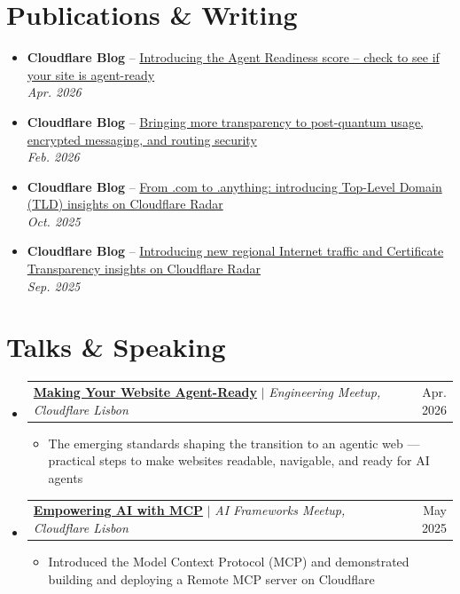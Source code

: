 \documentclass[letterpaper,11pt]{article}
\makeatletter
\newcommand{\resumeItem}[1]{
  \item\small{
    {#1 \vspace{-2pt}}
  }
}
\newcommand{\resumeProjectHeading}[2]{
    \item
    \begin{tabular*}{0.97\textwidth}{l@{\extracolsep{\fill}}r}
      \small#1 & #2 \\
    \end{tabular*}\vspace{-7pt}
}
\newcommand{\resumePublicationHeading}[2]{
    \item
    \small{#1} \\
    \textit{\small #2}\vspace{-5pt}
}
\newcommand{\resumeSubHeadingListStart}{\begin{itemize}[leftmargin=0.15in, label={}]}
\newcommand{\resumeSubHeadingListEnd}{\end{itemize}}
\newcommand{\resumeItemListStart}{\begin{itemize}}
\newcommand{\resumeItemListEnd}{\end{itemize}\vspace{-5pt}}
\makeatother
\begin{document}
\section{Publications \& Writing}
  \resumeSubHeadingListStart
    \resumePublicationHeading
        {\textbf{Cloudflare Blog} -- \href{https://blog.cloudflare.com/agent-readiness/}{Introducing the Agent Readiness score -- check to see if your site is agent-ready}}{Apr. 2026}
    \resumePublicationHeading
        {\textbf{Cloudflare Blog} -- \href{https://blog.cloudflare.com/radar-origin-pq-key-transparency-aspa/}{Bringing more transparency to post-quantum usage, encrypted messaging, and routing security}}{Feb. 2026}
    \resumePublicationHeading
        {\textbf{Cloudflare Blog} -- \href{https://blog.cloudflare.com/introducing-tld-insights-on-cloudflare-radar/}{From .com to .anything: introducing Top-Level Domain (TLD) insights on Cloudflare Radar}}{Oct. 2025}
    \resumePublicationHeading
        {\textbf{Cloudflare Blog} -- \href{https://blog.cloudflare.com/new-regional-internet-traffic-and-certificate-transparency-insights-on-radar/}{Introducing new regional Internet traffic and Certificate Transparency insights on Cloudflare Radar}}{Sep. 2025}
  \resumeSubHeadingListEnd


\section{Talks \& Speaking}
  \resumeSubHeadingListStart
    \resumeProjectHeading
        {\href{https://luma.com/deu000j7}{\textbf{Making Your Website Agent-Ready}} $|$ \emph{Engineering Meetup, Cloudflare Lisbon}}{Apr. 2026}
        \resumeItemListStart
          \resumeItem{The emerging standards shaping the transition to an agentic web --- practical steps to make websites readable, navigable, and ready for AI agents}
        \resumeItemListEnd
    \resumeProjectHeading
        {\href{https://lu.ma/lvr717q6}{\textbf{Empowering AI with MCP}} $|$ \emph{AI Frameworks Meetup, Cloudflare Lisbon}}{May 2025}
        \resumeItemListStart
          \resumeItem{Introduced the Model Context Protocol (MCP) and demonstrated building and deploying a Remote MCP server on Cloudflare}
        \resumeItemListEnd
  \resumeSubHeadingListEnd


\end{document}
